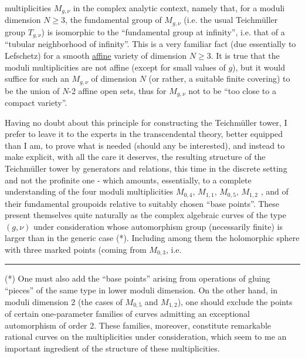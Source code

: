 
multiplicities $M_{g,\nu}$ in the complex analytic context,
namely that, for a moduli dimension $N \geq 3$, the fundamental
group of $M_{g,\nu}$ (i.e. the usual Teichmüller group $T_{g,\nu}$)
is isomorphic to the ``fundamental group at infinity'', i.e. that of a
``tubular neighborhood of infinity''. This is a very familiar fact
(due essentially to Lefschetz) for a smooth \uline{affine} variety of
dimension $N \geq 3$. It is true that the moduli multiplicities are
not affine (except for small values of $g$), but it would suffice
for such an $M_{g,\nu}$ of dimension $N$ (or rather, a suitable finite
covering) to be the union of $N$-2 affine open sets, thus
for $M_{g,\nu}$ not to be ``too close to a compact variety''.

Having no doubt about this principle for constructing the
Teichmüller tower, I prefer to leave it to the experts in the transcendental
theory, better equipped than I am, to prove what is needed
(should any be interested), and instead to make explicit,
with all the care it deserves, the resulting structure of the
Teichmüller tower by generators and relations, this time in the
discrete setting and not the profinite one - which amounts, essentially,
to a complete understanding of the four moduli multiplicities
$M_{0,4}$, $M_{1,1}$, $M_{0,5}$, $M_{1,2}$ , and of their fundamental groupoids relative
to suitably chosen ``base points''. These present themselves
quite naturally as the complex algebraic curves of the type
$(g,\nu)$ under consideration whose automorphism group (necessarily
finite) is larger than in the generic case (*). Including among them the
holomorphic sphere with three marked points (coming from $M_{0,3}$, i.e.

\rule{4cm}{0.4pt}

(*) One must also add the ``base points'' arising from operations
of gluing ``pieces'' of the same type in lower moduli dimension.
On the other hand, in moduli dimension 2 (the cases of $M_{0,5}$ and $M_{1,2}$),
one should exclude the points of certain one-parameter families
of curves admitting an exceptional automorphism of order 2. These
families, moreover, constitute remarkable rational curves on the multiplicities
under consideration, which seem to me an important ingredient
of the structure of these multiplicities.


